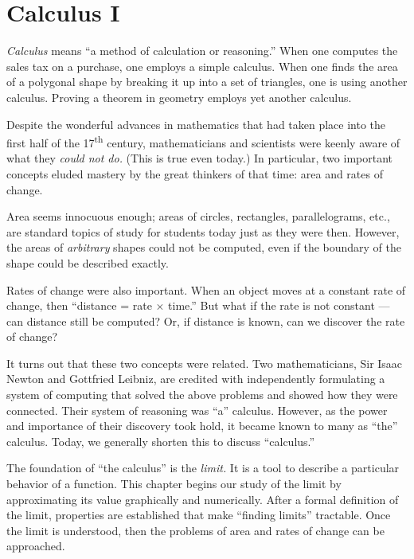 \part*[Calculus I]{Calculus I}\thispagestyle{empty}



\textit{Calculus} means ``a method of calculation or reasoning.'' When one computes the sales tax on a purchase, one employs a simple calculus. When one finds the area of a polygonal shape by breaking it up into a set of triangles, one is using another calculus. Proving a theorem in geometry employs yet another calculus.

Despite the wonderful advances in mathematics that had taken place into the first half of the 17\textsuperscript{th} century, mathematicians and scientists were keenly aware of what they \textit{could not do.} (This is true even today.) In particular, two important concepts eluded mastery by the great thinkers of that time: area and rates of change. 

Area seems innocuous enough; areas of circles, rectangles, parallelograms, etc., are standard topics of study for students today just as they were then. However, the areas of \textit{arbitrary} shapes could not be computed, even if the boundary of the shape could be described exactly. 

Rates of change were also important. When an object moves at a constant rate of change, then ``distance = rate $\times$ time.'' But what if the rate is not constant --- can distance still be computed? Or, if distance is known, can we discover the rate of change?

It turns out that these two concepts were related. Two mathematicians, Sir Isaac Newton and Gottfried Leibniz, are credited with independently formulating a system of computing that solved the above problems and showed how they were connected. Their system of reasoning was ``a'' calculus. However, as the power and importance of their discovery took hold, it became known to many as ``the'' calculus. Today, we generally shorten this to discuss ``calculus.''

The foundation of ``the calculus'' is the \textit{limit.} It is a tool to describe a particular behavior of a function. This chapter begins our study of the limit by approximating its value graphically and numerically. After a formal definition of the limit, properties are established that make ``finding limits'' tractable. Once the limit is understood, then the problems of area and rates of change can be approached.

